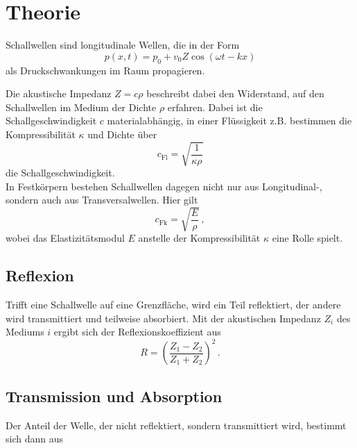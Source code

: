 \section{Theorie}
\label{sec:theorie}


Schallwellen sind longitudinale Wellen, die in der Form
\begin{equation}
    p(x, t) = p_0 + v_0 Z \cos(\omega t - k x)
    \label{eq:druckwelle}
\end{equation}
als Druckschwankungen im Raum propagieren.

Die akustische Impedanz $Z = c \rho$ beschreibt dabei den
Widerstand, auf den Schallwellen im Medium der Dichte $\rho$
erfahren.
Dabei ist die Schallgeschwindigkeit $c$ materialabhängig, in einer
Flüssigkeit z.B. bestimmen die Kompressibilität $\kappa$ 
und Dichte über
\begin{equation}
    c_\text{Fl} = \sqrt{\frac{1}{\kappa \rho}}
\end{equation}
die Schallgeschwindigkeit. \\

In Festkörpern bestehen Schallwellen dagegen nicht nur aus 
Longitudinal-, sondern auch aus Transversalwellen.
Hier gilt
\begin{equation}
    c_\text{Fk} = \sqrt{\frac{E}{\rho}} \,,
\end{equation}
wobei das Elastizitätsmodul $E$ anstelle der Kompressibilität
$\kappa$ eine Rolle spielt. \\


\subsection{Reflexion}

Trifft eine Schallwelle auf eine Grenzfläche, wird ein Teil
reflektiert, der andere wird transmittiert und teilweise
absorbiert.
Mit der akustischen Impedanz $Z_i$ des Mediums $i$ ergibt sich
der Reflexionskoeffizient aus
\begin{equation}
    R = \left(\frac{Z_1 - Z_2}{Z_1 + Z_2}\right)^2 \,.
    \label{eq:reflexkoeff}
\end{equation}

\subsection{Transmission und Absorption}

Der Anteil der Welle, der nicht reflektiert, sondern 
transmittiert wird, bestimmt sich dann aus

